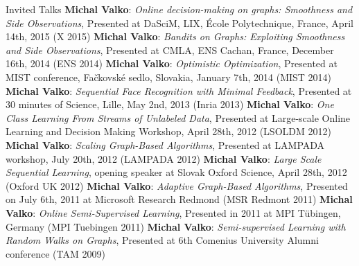 \documentclass{resume}
\begin{document}
\begin{category}{Invited Talks}
\citembullet
{\bf  Michal Valko}:  \emph{Online decision-making on graphs: Smoothness and Side Observations},
 Presented  at DaSciM, LIX, \'Ecole Polytechnique, France, April 14th, 2015 
({\sf X 2015})
\citembullet
{\bf  Michal Valko}:  \emph{Bandits on Graphs: Exploiting Smoothness and Side Observations},
 Presented  at CMLA, ENS Cachan, France, December 16th, 2014 
({\sf ENS 2014})
\citembullet
{\bf  Michal Valko}:  \emph{Optimistic Optimization},
 Presented  at MIST conference, Fa\v ckovsk\' e sedlo, Slovakia, January 7th, 2014
({\sf MIST 2014})
\citembullet
{\bf  Michal Valko}:  \emph{Sequential Face Recognition with Minimal Feedback},
Presented at 30 minutes of Science, Lille, May 2nd, 2013 ({\sf Inria 2013})
\citembullet
{\bf  Michal Valko}:  \emph{One Class Learning From Streams of Unlabeled Data},
Presented at Large-scale Online Learning and Decision Making Workshop,
April 28th, 2012 ({\sf LSOLDM 2012})
\citembullet
{\bf  Michal Valko}:  \emph{Scaling Graph-Based Algorithms}, Presented at
LAMPADA workshop, July 20th, 2012 ({\sf LAMPADA 2012})
\citembullet
{\bf  Michal Valko}:  \emph{Large Scale Sequential Learning}, opening speaker at
Slovak Oxford Science, April 28th, 2012 ({\sf Oxford UK 2012})
\citembullet
{\bf  Michal Valko}:  \emph{Adaptive Graph-Based Algorithms}, Presented on July
6th, 2011 at Microsoft Research Redmond ({\sf MSR Redmont 2011})
\citembullet
{\bf  Michal Valko}:  \emph{Online Semi-Supervised Learning}, Presented in 2011
at MPI T\"{u}bingen, Germany ({\sf MPI Tuebingen 2011})
\citembullet
{\bf  Michal Valko}:  \emph{Semi-supervised Learning with Random Walks on
Graphs}, Presented at 6th Comenius University Alumni conference ({\sf TAM 2009})
\end{category}
\end{document}
